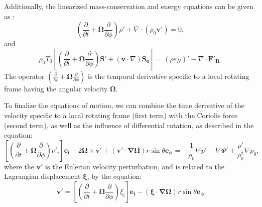 \documentclass{article}
\begin{document}
Additionally, the linearized mass-conservation and energy equations can be given as \cite{aerts2010asteroseismology, hansen2004stellar, pedlosky2013geophysical, unno1989nonradial}:
\begin{equation}
    \left( \frac{\partial}{\partial t} + \mathbf{\Omega} \frac{\partial}{\partial \phi} \right)\rho' + \nabla\cdot(\rho_{0}\mathbf{v'}) = 0,
\end{equation}
and
\begin{equation}
    \rho_{0}T_{0}\left[\left( \frac{\partial}{\partial t} + \mathbf{\Omega} \frac{\partial}{\partial \phi} \right)\mathbf{S'} + (\mathbf{v}\cdot \nabla)\mathbf{S_{0}} \right] = (\rho\varepsilon_{N})' - \nabla \cdot \mathbf{F'_{R}}.
\end{equation}
The operator $\left( \frac{\partial}{\partial t} + \mathbf{\Omega} \frac{\partial}{\partial \phi} \right)$ is the temporal derivative specific to a local rotating frame having the angular velocity $\mathbf{\Omega}$.

To finalize the equations of motion, we can combine the time derivative of the velocity specific to a local rotating frame (first term) with the Coriolis force (second term), as well as the influence of differential rotation, as described in the equation\cite{aerts2010asteroseismology, hansen2004stellar, pedlosky2013geophysical, unno1989nonradial}:
\begin{equation}
     \left[\left( \frac{\partial}{\partial t} + \mathbf{\Omega} \frac{\partial}{\partial \phi} \right)\nu'_{i}\right]\mathbf{e_{i}} + 2\mathbf{\Omega\times v'} + \mathbf{(v'\cdot\nabla\Omega)}r\sin\theta \mathbf{e_{\phi}} = -\frac{1}{\rho_{0}}\nabla p' - \nabla \Phi' + \frac{\rho'}{\rho_{0}^{2}}\nabla p_{0},
\end{equation}
where the $\mathbf{v'}$ is the Eulerian velocity perturbation, and is related to the Lagrangian displacement $\mathbf{\xi}$, by the equation:
\begin{equation}
    \mathbf{v'} =  \left[\left( \frac{\partial}{\partial t} + \mathbf{\Omega} \frac{\partial}{\partial \phi} \right)\xi_{i}\right]\mathbf{e_{i}} - \mathbf{(\xi \cdot\nabla\Omega)}r\sin\theta \mathbf{e_{\phi}}
\end{equation}
\end{document}
